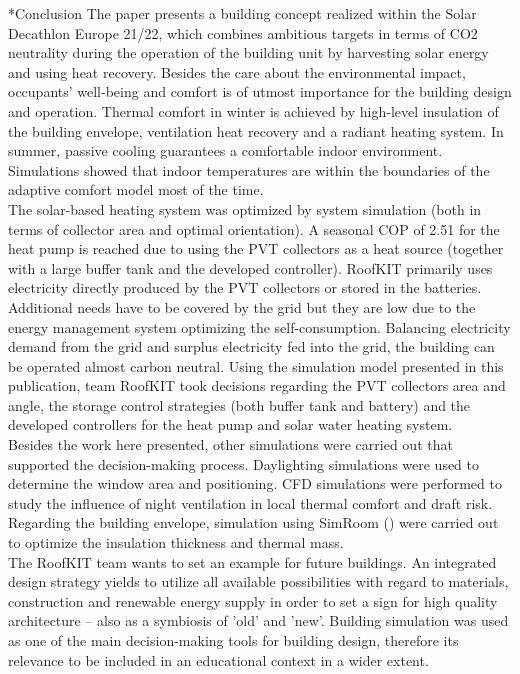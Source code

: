 \documentclass[twocolumn, a4paper,10pt]{article}
\makeatletter
\renewcommand\section{\@startsection{section}{1}{\z@}{3pt}{3pt}{\normalfont\large\bfseries}}
\makeatother
\begin{document}
\section*{Conclusion}
The paper presents a building concept realized within the Solar Decathlon Europe 21/22, which combines ambitious targets in terms of CO2 neutrality during the operation of the building unit by harvesting solar energy and using heat recovery. Besides the care about the environmental impact, occupants' well-being and comfort is of utmost importance for the building design and operation. Thermal comfort in winter is achieved by high-level insulation of the building envelope, ventilation heat recovery and a radiant heating system. In summer, passive cooling guarantees a comfortable indoor environment. Simulations showed that indoor temperatures are within the boundaries of the adaptive comfort model most of the time.\\
The solar-based heating system was optimized by system simulation (both in terms of collector area and optimal orientation). A seasonal COP of 2.51 for the heat pump is reached due to using the PVT collectors as a heat source (together with a large buffer tank and the developed controller). RoofKIT primarily uses electricity directly produced by the PVT collectors or stored in the batteries. Additional needs have to be covered by the grid but they are low due to the energy management system optimizing the self-consumption. Balancing electricity demand from the grid and surplus electricity fed into the grid, the building can be operated almost carbon neutral. Using the simulation model presented in this publication, team RoofKIT took decisions regarding the PVT collectors area and angle, the storage control strategies (both buffer tank and battery) and the developed controllers for the heat pump and solar water heating system. \\
Besides the work here presented, other simulations were carried out that supported the decision-making process. Daylighting simulations were used to determine the window area and positioning. CFD simulations were performed to study the influence of night ventilation in local thermal comfort and draft risk. Regarding the building envelope, simulation using SimRoom (\citeyear{SimRoom2022}) were carried out to optimize the insulation thickness and thermal mass.\\
The RoofKIT team wants to set an example for future buildings. An integrated design strategy yields to utilize all available possibilities with regard to materials, construction and renewable energy supply in order to set a sign for high quality architecture – also as a symbiosis of 'old' and 'new'. Building simulation was used as one of the main decision-making tools for building design, therefore its relevance to be included in an educational context in a wider extent.\\
\end{document}
